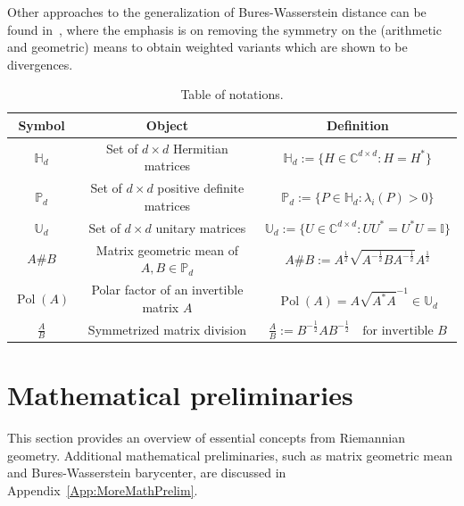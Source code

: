 \documentclass[12pt]{article}
\theoremstyle{definition}
\begin{document}
Other approaches to the generalization of Bures-Wasserstein distance can be found in~\cite{pitrik2020quantum, dinh2021alpha}, where the emphasis is on removing the symmetry on the (arithmetic and geometric) means to obtain weighted variants which are shown to be divergences.




\begin{table}[ht]
    \centering
    \begin{tabular}{|c|c|c|}
        \hline
        \textbf{Symbol} & \textbf{Object} & \textbf{Definition} \\
        \hline
        $ \mathbb H_d $ & Set of $d \times d $ Hermitian matrices & $ \mathbb H_d := \{H \in \mathbb C^{d \times d} : H = H^* \} $ \\
        $ \mathbb P_d $ & Set of $d \times d $ positive definite matrices & $ \mathbb P_d := \{P \in \mathbb H_d : \lambda_i(P) > 0\}$ \\
        $ \mathbb U_d $ & Set of $d \times d $ unitary matrices & $ \mathbb U_d := \{U \in \mathbb C^{d \times d} : U U^* = U^*U = \mathbb I\}$ \\

        $ A \# B $ & Matrix geometric mean of $A, B \in \mathbb P_d$ & $ A \# B := A ^{\frac12} \sqrt{A ^{-\frac12} B A ^{-\frac12} } A ^{\frac12}  $ \\
        $ \operatorname{Pol}(A)$ & Polar factor of an invertible matrix $A$ & $ \operatorname{Pol}(A) = A \sqrt{A^*A}^{-1} \in \mathbb U_d $ \\
        
        $ \frac{A}{B}$ & Symmetrized matrix division & $ \frac AB := B ^{-\frac12} A B ^{-\frac12} \quad \text{for invertible } B $  \\

        \hline
    \end{tabular}
    \caption{Table of notations.}
    \label{tab:notation}
\end{table}



\section{Mathematical preliminaries}\label{Sec:MathPre}

This section provides an overview of essential concepts from Riemannian geometry. Additional mathematical preliminaries, such as matrix geometric mean and Bures-Wasserstein barycenter, are discussed in Appendix~\ref{App:MoreMathPrelim}.
\end{document}
